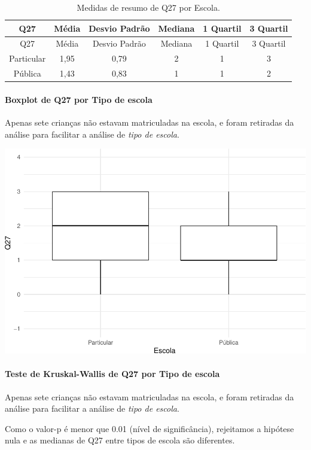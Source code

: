 \documentclass[]{article}
\let\oldparagraph\paragraph
\renewcommand{\paragraph}[1]{\oldparagraph{#1}\mbox{}}
\begin{document}
\begin{longtable}[]{@{}cccccc@{}}
\caption{\label{tab:unnamed-chunk-824}Medidas de resumo de Q27 por Escola.}\tabularnewline
\toprule
Q27 & Média & Desvio Padrão & Mediana & 1 Quartil & 3 Quartil\tabularnewline
\midrule
\endfirsthead
\toprule
Q27 & Média & Desvio Padrão & Mediana & 1 Quartil & 3 Quartil\tabularnewline
\midrule
\endhead
Particular & 1,95 & 0,79 & 2 & 1 & 3\tabularnewline
Pública & 1,43 & 0,83 & 1 & 1 & 2\tabularnewline
\bottomrule
\end{longtable}

\hypertarget{boxplot-de-q27-por-tipo-de-escola}{%
\paragraph{Boxplot de Q27 por Tipo de escola}\label{boxplot-de-q27-por-tipo-de-escola}}

Apenas sete crianças não estavam matriculadas na escola, e foram retiradas da análise para facilitar a análise de \emph{tipo de escola}.

\begin{center}\includegraphics[width=0.75\linewidth]{relatorio_covid19_files/figure-latex/unnamed-chunk-825-1} \end{center}

\hypertarget{teste-de-kruskal-wallis-de-q27-por-tipo-de-escola}{%
\paragraph{Teste de Kruskal-Wallis de Q27 por Tipo de escola}\label{teste-de-kruskal-wallis-de-q27-por-tipo-de-escola}}

Apenas sete crianças não estavam matriculadas na escola, e foram retiradas da análise para facilitar a análise de \emph{tipo de escola}.

Como o valor-p é menor que 0.01 (nível de significância), rejeitamos a hipótese nula e as medianas de Q27 entre tipos de escola são diferentes.
\end{document}

